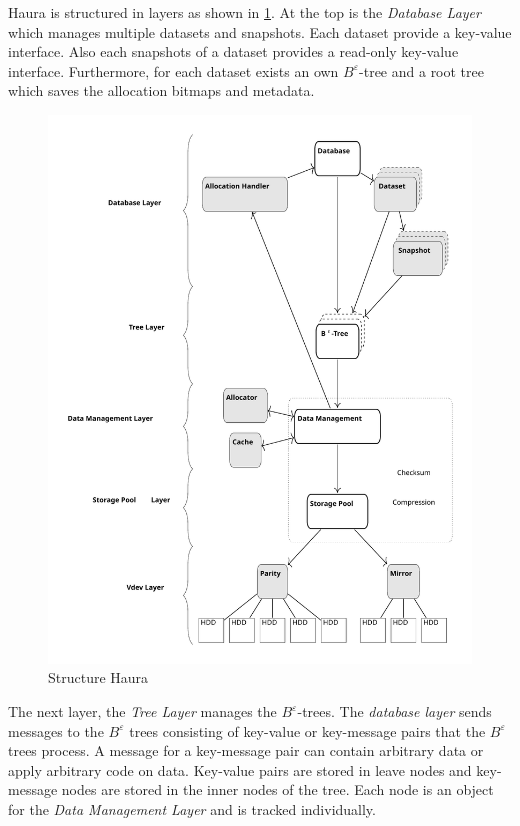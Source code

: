\documentclass[
	12pt,
	a4paper,
	abstract,
	bibliography=totoc,
	chapterprefix,
	headings=openright,
	numbers=endperiod,
	parskip=half,
	twoside,
]{scrreprt}
\begin{document}
Haura is structured in layers as shown in \cref{fig:structure Haura}.
At the top is the \emph{Database Layer} which manages multiple datasets and snapshots. 
Each dataset provide a key-value interface. Also each snapshots of a dataset provides a read-only key-value interface. 
Furthermore, for each dataset exists an own $B^{\varepsilon}$-tree and a root tree which saves the allocation bitmaps and metadata.

\begin{figure}[ht]
	\centering
	\includegraphics[scale=0.4]{overview_haura_level.pdf}
	\caption{Structure Haura \cite{wiedemann2018modern}}
		\label{fig:structure Haura}
\end{figure}

The next layer, the \emph{Tree Layer} manages the $B^{\varepsilon}$-trees.
The \emph{database layer} sends messages to the $B^{\varepsilon}$ trees consisting of key-value or key-message pairs that 
the $B^{\varepsilon}$ trees process. 
A message for a key-message pair can contain arbitrary data or apply arbitrary code on data.
Key-value pairs are stored in leave nodes and key-message nodes are stored in the inner nodes of the tree.
Each node is an object for the \emph{Data Management Layer} and is tracked individually.
\end{document}
